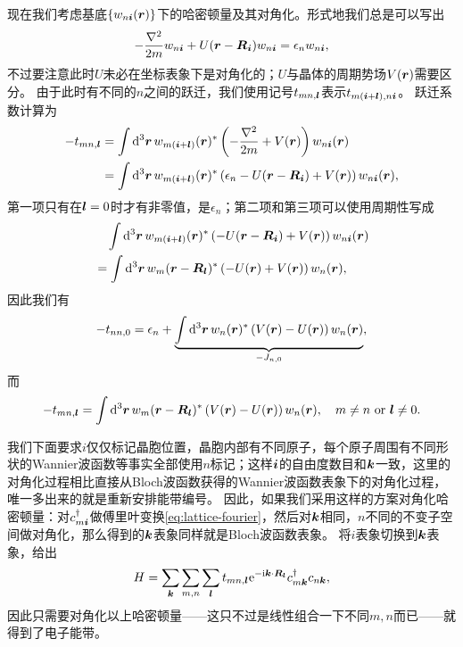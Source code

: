 现在我们考虑基底$\{w_{n \vb*{i}}(\vb*{r}) \}$下的哈密顿量及其对角化。形式地我们总是可以写出
\begin{equation}
    - \frac{\laplacian}{2m} w_{n \vb*{i}} + U(\vb*{r} - \vb*{R}_{\vb*{i}}) w_{n \vb*{i}} = \epsilon_{n} w_{n \vb*{i}},
\end{equation}
不过要注意此时$U$未必在坐标表象下是对角化的；$U$与晶体的周期势场$V(\vb*{r})$需要区分。
由于此时有不同的$n$之间的跃迁，我们使用记号$t_{mn, \vb*{l}}$表示$t_{m(\vb*{i}+\vb*{l}), n\vb*{i}}$。
跃迁系数计算为
\[
    \begin{aligned}
        - t_{mn, \vb*{l}} &= \int \dd[3]{\vb*{r}} w_{m(\vb*{i}+\vb*{l})}(\vb*{r})^* \left( - \frac{\laplacian}{2m} + V(\vb*{r}) \right) w_{n \vb*{i}}(\vb*{r}) \\
        &= \int \dd[3]{\vb*{r}} w_{m(\vb*{i}+\vb*{l})}(\vb*{r})^* \left( \epsilon_n - U(\vb*{r} - \vb*{R}_{\vb*{i}}) + V(\vb*{r}) \right) w_{n\vb*{i}}(\vb*{r}),
    \end{aligned}
\]
第一项只有在$\vb*{l}=0$时才有非零值，是$\epsilon_n$；第二项和第三项可以使用周期性写成
\[
    \begin{aligned}
        &\quad \int \dd[3]{\vb*{r}} w_{m (\vb*{i}+\vb*{l})}(\vb*{r})^* \left( - U(\vb*{r} - \vb*{R}_{\vb*{i}}) + V(\vb*{r}) \right) w_{n \vb*{i}}(\vb*{r}) \\
        &= \int \dd[3]{\vb*{r}} w_{m}(\vb*{r} - \vb*{R}_{\vb*{l}})^* \left( - U(\vb*{r}) + V(\vb*{r}) \right) w_{n}(\vb*{r}),
    \end{aligned}
\]
因此我们有
\begin{equation}
    - t_{nn, 0} = \epsilon_n + \underbrace{\int \dd[3]{\vb*{r}} w_{n}(\vb*{r})^* \left(V(\vb*{r}) - U(\vb*{r}) \right) w_{n}(\vb*{r})}_{- J_{n, 0}},
\end{equation}
而
\begin{equation}
    - t_{mn, \vb*{l}} = \int \dd[3]{\vb*{r}} w_{m}(\vb*{r} - \vb*{R}_{\vb*{l}})^* \left( V(\vb*{r}) - U(\vb*{r}) \right) w_{n}(\vb*{r}), \quad \text{$m \neq n$ or $\vb*{l} \neq 0$}.
    \label{eq:off-diagnoal-hopping}
\end{equation}

我们下面要求$i$仅仅标记晶胞位置，晶胞内部有不同原子，每个原子周围有不同形状的Wannier波函数等事实全部使用$n$标记；这样$\vb*{i}$的自由度数目和$\vb*{k}$一致，这里的对角化过程相比直接从Bloch波函数获得的Wannier波函数表象下的对角化过程，唯一多出来的就是重新安排能带编号。
因此，如果我们采用这样的方案对角化哈密顿量：对$c_{m\vb*{i}}^\dagger$做傅里叶变换\eqref{eq:lattice-fourier}，然后对$\vb*{k}$相同，$n$不同的不变子空间做对角化，那么得到的$\vb*{k}$表象同样就是Bloch波函数表象。
将$i$表象切换到$\vb*{k}$表象，给出
\begin{equation}
    H = \sum_{\vb*{k}} \sum_{m, n} \sum_{\vb*{l}} t_{mn, \vb*{l}} \mathrm{e}^{- \mathrm{i} \vb*{k} \cdot \vb*{R}_{\vb*{l}}} c^\dagger_{m \vb*{k}} c_{n \vb*{k}} ,
    \label{eq:k-points-with-hopping-bands}
\end{equation}
因此只需要对角化以上哈密顿量——这只不过是线性组合一下不同$m, n$而已——就得到了电子能带。

